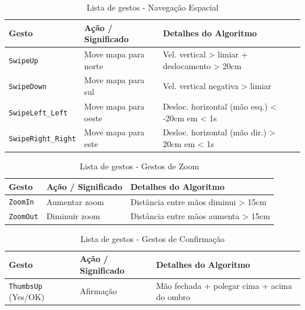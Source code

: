 \documentclass{report}
\begin{document}
\begin{longtable}{p{} p{} p{}}
    \caption{Lista de gestos - Navegação Espacial} 
    \label{tab:navegacao-espacial} \\

    \toprule
    \textbf{Gesto} & \textbf{Ação / Significado} & \textbf{Detalhes do Algoritmo} \\
    \midrule
    \endfirsthead
    \endlastfoot

    \texttt{SwipeUp} & Move mapa para norte & Vel. vertical > limiar + deslocamento > 20cm \\
    \texttt{SwipeDown} & Move mapa para sul & Vel. vertical negativa > limiar \\
    \texttt{SwipeLeft\_Left} & Move mapa para oeste & Desloc. horizontal (mão esq.) < -20cm em < 1s \\
    \texttt{SwipeRight\_Right} & Move mapa para este & Desloc. horizontal (mão dir.) > 20cm em < 1s \\
\end{longtable}

\begin{longtable}{p{} p{} p{}}
    \caption{Lista de gestos - Gestos de Zoom}
    \label{tab:gestos-zoom} \\
    
    \toprule
    \textbf{Gesto} & \textbf{Ação / Significado} & \textbf{Detalhes do Algoritmo} \\
    \midrule
    \endfirsthead
    \endlastfoot

    \texttt{ZoomIn} & Aumentar zoom & Distância entre mãos diminui > 15cm \\
    \texttt{ZoomOut} & Diminuir zoom & Distância entre mãos aumenta > 15cm \\
\end{longtable}

\begin{longtable}{p{} p{} p{}}
    \caption{Lista de gestos - Gestos de Confirmação} 
    \label{tab:gestos-confirmacao} \\
    
    \toprule
    \textbf{Gesto} & \textbf{Ação / Significado} & \textbf{Detalhes do Algoritmo} \\
    \midrule
    \endfirsthead
    \endlastfoot
    
    \texttt{ThumbsUp} (Yes/OK) & Afirmação & Mão fechada + polegar cima + acima do ombro \\
\end{longtable}
\end{document}
